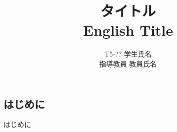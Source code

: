 \documentclass[a4paper]{jsarticle}
\title{\huge タイトル \\
\Large English Title } %
\author{
T5-?? \: 学生氏名\\
指導教員 \: 教員氏名
}
\date{}
\begin{document}
\maketitle


\begin{multicols}{2}
\section{はじめに}
はじめに

\end{multicols}
\end{document}

